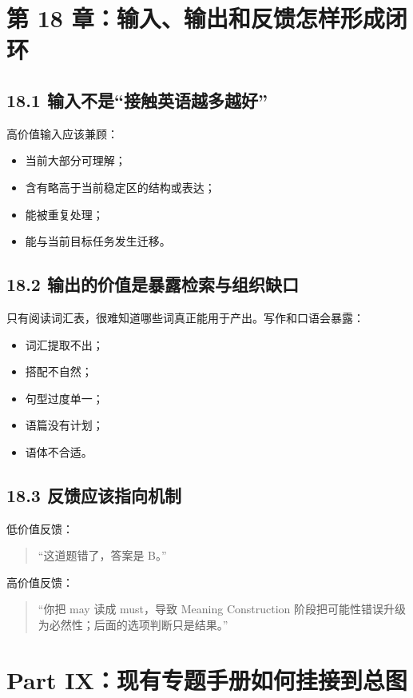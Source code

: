 \documentclass[11pt,a4paper]{ctexart}
\begin{document}
\section{第 18 章：输入、输出和反馈怎样形成闭环}

\subsection{18.1 输入不是“接触英语越多越好”}
高价值输入应该兼顾：
\begin{itemize}
  \item 当前大部分可理解；
  \item 含有略高于当前稳定区的结构或表达；
  \item 能被重复处理；
  \item 能与当前目标任务发生迁移。
\end{itemize}

\subsection{18.2 输出的价值是暴露检索与组织缺口}
只有阅读词汇表，很难知道哪些词真正能用于产出。写作和口语会暴露：
\begin{itemize}
  \item 词汇提取不出；
  \item 搭配不自然；
  \item 句型过度单一；
  \item 语篇没有计划；
  \item 语体不合适。
\end{itemize}

\subsection{18.3 反馈应该指向机制}
低价值反馈：
\begin{quote}
“这道题错了，答案是 B。”
\end{quote}
高价值反馈：
\begin{quote}
“你把 may 读成 must，导致 Meaning Construction 阶段把可能性错误升级为必然性；后面的选项判断只是结果。”
\end{quote}

\newpage
\section{Part IX：现有专题手册如何挂接到总图}
\end{document}

